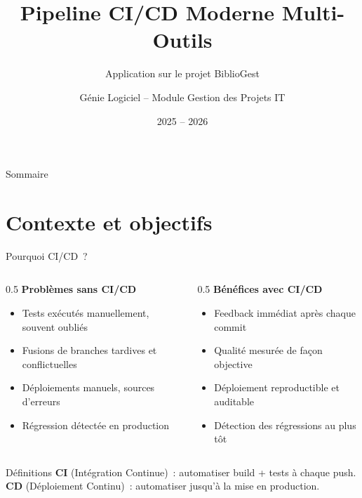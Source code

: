 \documentclass[aspectratio=169,12pt]{beamer}
\title[CI/CD BiblioGest]{Pipeline CI/CD Moderne Multi-Outils}
\subtitle{Application sur le projet BiblioGest}
\author{Génie Logiciel -- Module Gestion des Projets IT}
\date{2025 -- 2026}
\begin{document}
\begin{frame}
  \titlepage
\end{frame}

\begin{frame}{Sommaire}
  \tableofcontents[hideallsubsections]
\end{frame}

\section{Contexte et objectifs}

\begin{frame}{Pourquoi CI/CD~?}
  \begin{columns}
    \begin{column}{0.5\textwidth}
      \textbf{Problèmes sans CI/CD}
      \begin{itemize}
        \item Tests exécutés manuellement, souvent oubliés
        \item Fusions de branches tardives et conflictuelles
        \item Déploiements manuels, sources d'erreurs
        \item Régression détectée en production
      \end{itemize}
    \end{column}
    \begin{column}{0.5\textwidth}
      \textbf{Bénéfices avec CI/CD}
      \begin{itemize}
        \item Feedback immédiat après chaque commit
        \item Qualité mesurée de façon objective
        \item Déploiement reproductible et auditable
        \item Détection des régressions au plus tôt
      \end{itemize}
    \end{column}
  \end{columns}

  \vspace{0.6em}
  \begin{block}{Définitions}
    \textbf{CI} (Intégration Continue)~: automatiser build + tests à chaque push.\\
    \textbf{CD} (Déploiement Continu)~: automatiser jusqu'à la mise en production.
  \end{block}
\end{frame}
\end{document}

